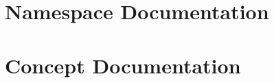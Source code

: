 \documentclass[twoside]{book}
\newcommand{\+}{\discretionary{\mbox{\scriptsize$\hookleftarrow$}}{}{}}
\begin{document}
\chapter{Namespace Documentation}

\chapter{Concept Documentation}









\end{document}
